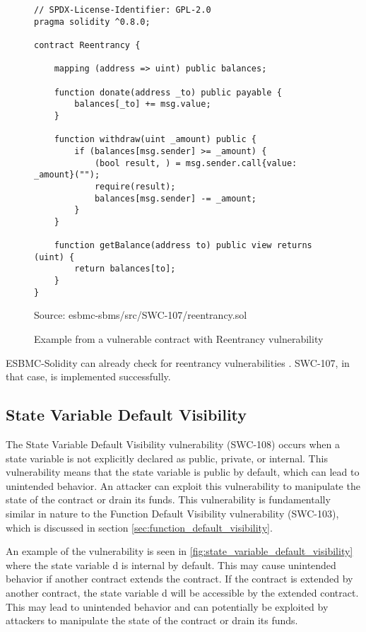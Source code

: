 \begin{figure}
\begin{lstlisting}
// SPDX-License-Identifier: GPL-2.0
pragma solidity ^0.8.0;

contract Reentrancy {

    mapping (address => uint) public balances;

    function donate(address _to) public payable {
        balances[_to] += msg.value;
    }

    function withdraw(uint _amount) public {
        if (balances[msg.sender] >= _amount) {
            (bool result, ) = msg.sender.call{value: _amount}("");
            require(result);
            balances[msg.sender] -= _amount;
        }
    }

    function getBalance(address to) public view returns (uint) {
        return balances[to];
    }
}
\end{lstlisting}
\caption{Example from a vulnerable contract with Reentrancy vulnerability }
Source: esbmc-sbms/src/SWC-107/reentrancy.sol
\label{fig:reentrancy}
\end{figure}

ESBMC-Solidity can already check for reentrancy vulnerabilities \cite{salim2022esbmc}. SWC-107, in that case, is implemented successfully.

\subsection{State Variable Default Visibility}
\label{sec:state_variable_default_visibility}

The State Variable Default Visibility vulnerability (SWC-108) occurs when a state variable is not explicitly declared as public, private, or internal. This vulnerability means that the state variable is public by default, which can lead to unintended behavior. An attacker can exploit this vulnerability to manipulate the state of the contract or drain its funds. This vulnerability is fundamentally similar in nature to the Function Default Visibility vulnerability (SWC-103), which is discussed in section \ref{sec:function_default_visibility}.

An example of the vulnerability is seen in \ref{fig:state_variable_default_visibility} where the state variable d is internal by default. This may cause unintended behavior if another contract extends the contract. If the contract is extended by another contract, the state variable d will be accessible by the extended contract. This may lead to unintended behavior and can potentially be exploited by attackers to manipulate the state of the contract or drain its funds.

